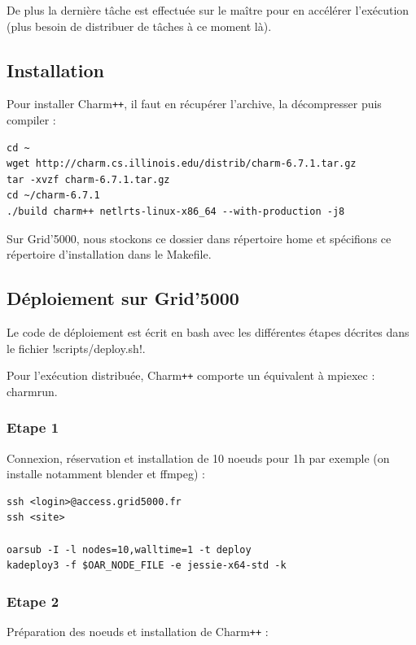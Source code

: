 \documentclass[a4paper, 11pt, titlepage]{article}
\begin{document}
De plus la dernière tâche est effectuée sur le maître pour en accélérer l'exécution (plus besoin de distribuer de tâches à ce moment là).


\subsection {Installation}

\noindent Pour installer Charm\texttt{++}, il faut en récupérer l'archive, la décompresser puis compiler :

\begin{verbatim}
cd ~
wget http://charm.cs.illinois.edu/distrib/charm-6.7.1.tar.gz
tar -xvzf charm-6.7.1.tar.gz
cd ~/charm-6.7.1
./build charm++ netlrts-linux-x86_64 --with-production -j8
\end{verbatim}

Sur Grid'5000, nous stockons ce dossier dans répertoire home et spécifions ce répertoire d'installation dans le Makefile.


\subsection {Déploiement sur Grid'5000}

Le code de déploiement est écrit en bash avec les différentes étapes décrites dans le fichier \noindent!scripts/deploy.sh!.

Pour l'exécution distribuée, Charm\texttt{++} comporte un équivalent à mpiexec : charmrun.


\subsubsection {Etape 1}

Connexion, réservation et installation de 10 noeuds pour 1h par exemple (on installe notamment blender et ffmpeg) :

\begin{verbatim}
ssh <login>@access.grid5000.fr
ssh <site>

oarsub -I -l nodes=10,walltime=1 -t deploy
kadeploy3 -f $OAR_NODE_FILE -e jessie-x64-std -k
\end{verbatim}

\subsubsection {Etape 2}

Préparation des noeuds et installation de Charm\texttt{++} :
\end{document}
